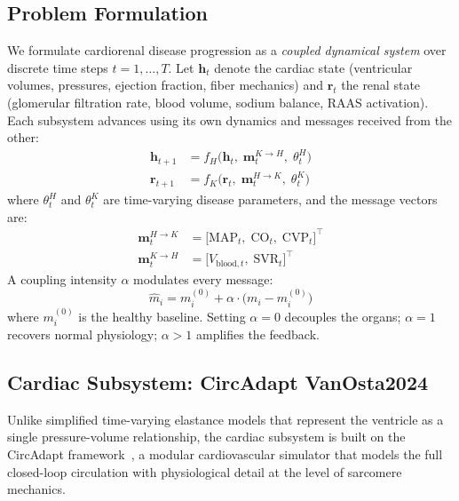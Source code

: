 \documentclass[pmlr]{jmlr}
\begin{document}
\subsection{Problem Formulation}
\label{sec:formulation}

We formulate cardiorenal disease progression as a \emph{coupled dynamical system} over discrete time steps $t = 1, \dots, T$. Let $\mathbf{h}_t$ denote the cardiac state (ventricular volumes, pressures, ejection fraction, fiber mechanics) and $\mathbf{r}_t$ the renal state (glomerular filtration rate, blood volume, sodium balance, RAAS activation). Each subsystem advances using its own dynamics and messages received from the other:
\begin{align}
\mathbf{h}_{t+1} &= f_H\!\bigl(\mathbf{h}_t,\; \mathbf{m}_{t}^{K \to H},\; \theta_t^H\bigr) \label{eq:heart}\\
\mathbf{r}_{t+1} &= f_K\!\bigl(\mathbf{r}_t,\; \mathbf{m}_{t}^{H \to K},\; \theta_t^K\bigr) \label{eq:kidney}
\end{align}
where $\theta_t^H$ and $\theta_t^K$ are time-varying disease parameters, and the message vectors are:
\begin{align}
\mathbf{m}^{H \to K}_t &= \bigl[\text{MAP}_t,\; \text{CO}_t,\; \text{CVP}_t\bigr]^\top \label{eq:h2k}\\
\mathbf{m}^{K \to H}_t &= \bigl[V_{\text{blood},t},\; \text{SVR}_t\bigr]^\top \label{eq:k2h}
\end{align}
A coupling intensity $\alpha$ modulates every message:
\begin{equation}
\hat{m}_i = m_i^{(0)} + \alpha \cdot \bigl(m_i - m_i^{(0)}\bigr)
\label{eq:alpha}
\end{equation}
where $m_i^{(0)}$ is the healthy baseline. Setting $\alpha = 0$ decouples the organs; $\alpha = 1$ recovers normal physiology; $\alpha > 1$ amplifies the feedback.

\subsection{Cardiac Subsystem: CircAdapt VanOsta2024}
\label{sec:heart}

Unlike simplified time-varying elastance models that represent the ventricle as a single pressure-volume relationship, the cardiac subsystem is built on the CircAdapt framework~\citep{vanosta2024}, a modular cardiovascular simulator that models the full closed-loop circulation with physiological detail at the level of sarcomere mechanics.
\end{document}
